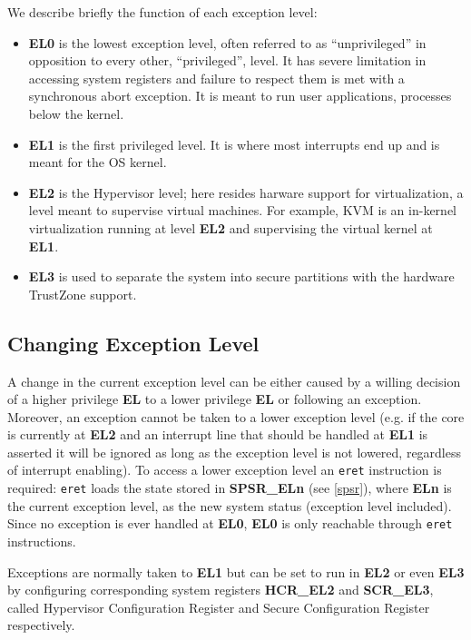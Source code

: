 \documentclass[12pt,a4paper,openright,twoside]{report}
\begin{document}
We describe briefly the function of each exception level:
\begin{itemize}
    \item \textbf{EL0} is the lowest exception level, often referred to as ``unprivileged''
        in opposition to every other, ``privileged'', level. It has severe 
        limitation in accessing system registers and failure to respect them
        is met with a synchronous abort exception. It is meant to run user applications, 
        processes below the kernel.
    \item \textbf{EL1} is the first privileged level. It is where most interrupts end
        up and is meant for the OS kernel.
    \item \textbf{EL2} is the Hypervisor level; here resides harware support for virtualization,
        a level meant to supervise virtual machines. For example, KVM is an in-kernel
        virtualization running at level \textbf{EL2} and supervising the virtual kernel 
        at \textbf{EL1}.
    \item \textbf{EL3} is used to separate the system into secure partitions with the
        hardware TrustZone support.
\end{itemize}

\subsection{Changing Exception Level}
A change in the current exception level can be either caused by a willing decision
of a higher privilege \textbf{EL} to a lower privilege \textbf{EL} or following 
an exception. Moreover, an exception cannot be taken to a lower exception level (e.g. if the core 
is currently at \textbf{EL2} and an interrupt line that should be handled
at \textbf{EL1} is asserted it will be ignored as long as the exception
level is not lowered, regardless of interrupt enabling). 
To access a lower exception level an {\tt eret} instruction is required: {\tt eret}
loads the state stored in \textbf{SPSR\_ELn} (see \ref{spsr}), where \textbf{ELn} 
is the current exception level, as the new system status (exception level included).
Since no exception is ever handled at \textbf{EL0}, \textbf{EL0} is only reachable 
through {\tt eret} instructions.

Exceptions are normally taken to \textbf{EL1} but can be set to run in \textbf{EL2}
or even \textbf{EL3} by configuring corresponding system registers \textbf{HCR\_EL2}
and \textbf{SCR\_EL3}, called Hypervisor Configuration Register and Secure Configuration
Register respectively. 
\end{document}
